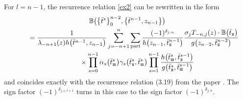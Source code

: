 \documentclass[10pt,a4paper]{amsart}
\newcommand{\st}{\scriptscriptstyle \rm I\hspace{-1pt}I}
\newcommand{\sth}{\scriptscriptstyle \rm I\hspace{-1pt}I\hspace{-1pt}I}
\newcommand{\bt}{{\bar t}}
\theoremstyle{definition}
\def\BB{{\mathbb{B}}}
\def\r#1{\eqref{#1}}
\begin{document}
\begin{itemize}
For $l=n-1$, the recurrence relation \r{ex2} can be rewritten in the form
\begin{gather*}%
 \BB\bigl(\bigl\{\bt^s\bigr\}_{0}^{n-2},\bigl\{\bt^{n-1},z_{n-1}\bigr\}\bigr)
 \\
\qquad = \frac{1}{\lambda_{-n+1}(z) h\bigl(\bt^{n-1},z_{n-1}\bigr)} \sum_{j=-n+1}^n\sum_{\rm part}
 \frac{(-1)^{\delta_{j,n}}}{h\bigl(z_{n-1},\bt^{n-1}_{\st}\bigr)}
 \frac{\sigma_{j} T_{-n,j}(z)\cdot\BB\bigl(\bt_{\st}\bigr)}{g\bigl(z_{n-2},\bt^{n-2}_{\st}\bigr)}\\
 \qquad\phantom{=}{}\times
 \prod_{s=0}^{n-1}\alpha_s\bigl(\bt^s_{\sth}\bigr)\gamma_s\bigl(\bt^s_{\st},\bt^s_{\sth}\bigr)
 \prod_{s=1}^{n-1}\frac{h\bigl(\bt^s_{\sth},\bt^{s-1}_{\st}\bigr)}{g\bigl(\bt^s_{\st},\bt^{s-1}_{\sth}\bigr)}
 \end{gather*}
and
coincides exactly with the
recurrence relation (3.19) from the paper \cite{LP2}. The sign factor $(-1)^{\delta_{j\geq l+1}}$
turns in this case to the sign factor $(-1)^{\delta_{j,n}}$.




\end{itemize}
\end{document}
